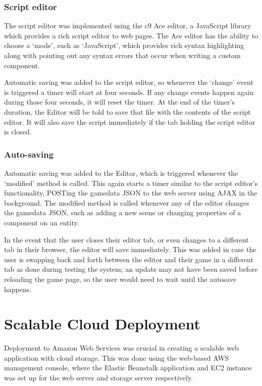 	\subsubsection{Script editor}
	The script editor was implemented using the c9 Ace editor, a JavaScript library which provides a rich script editor to web pages. The Ace editor has the ability to choose a `mode', such as `JavaScript', which provides rich syntax highlighting along with pointing out any syntax errors that occur when writing a custom component.

	Automatic saving was added to the script editor, so whenever the `change' event is triggered a timer will start at four seconds. If any change events happen again during those four seconds, it will reset the timer. At the end of the timer's duration, the Editor will be told to save that file with the contents of the script editor. It will also save the script immediately if the tab holding the script editor is closed.

	\subsubsection{Auto-saving}
	Automatic saving was added to the Editor, which is triggered whenever the `modified' method is called. This again starts a timer similar to the script editor's functionality, POSTing the gamedata JSON to the web server using AJAX in the background. The modified method is called whenever any of the editor changes the gamedata JSON, such as adding a new scene or changing properties of a component on an entity.

	In the event that the user closes their editor tab, or even changes to a different tab in their browser, the editor will save immediately. This was added in case the user is swapping back and forth between the editor and their game in a different tab as done during testing the system; an update may not have been saved before reloading the game page, so the user would need to wait until the autosave happens.

\section{Scalable Cloud Deployment}
Deployment to Amazon Web Services was crucial in creating a scalable web application with cloud storage. This was done using the web-based AWS management console, where the Elastic Beanstalk application and EC2 instance was set up for the web server and storage server respectively.

